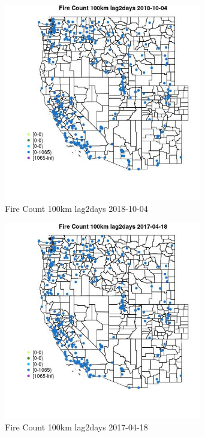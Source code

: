 \begin{figure} 
\centering  
\includegraphics[width=0.77\textwidth]{Code_Outputs/Report_ML_input_PM25_Step4_part_f_de_duplicated_aves_prioritize_24hr_obswNAs_MapObsFire_Count_100km_lag2days2018-10-04.jpg} 
\caption{\label{fig:Report_ML_input_PM25_Step4_part_f_de_duplicated_aves_prioritize_24hr_obswNAsMapObsFire_Count_100km_lag2days2018-10-04}Fire Count 100km lag2days 2018-10-04} 
\end{figure} 
 

\begin{figure} 
\centering  
\includegraphics[width=0.77\textwidth]{Code_Outputs/Report_ML_input_PM25_Step4_part_f_de_duplicated_aves_prioritize_24hr_obswNAs_MapObsFire_Count_100km_lag2days2017-04-18.jpg} 
\caption{\label{fig:Report_ML_input_PM25_Step4_part_f_de_duplicated_aves_prioritize_24hr_obswNAsMapObsFire_Count_100km_lag2days2017-04-18}Fire Count 100km lag2days 2017-04-18} 
\end{figure} 
 

